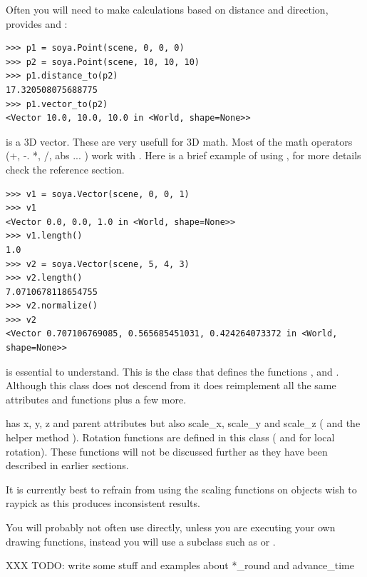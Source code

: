 Often you will need to make calculations based on distance and 
direction,  provides  and 
:
\begin{verbatim}
>>> p1 = soya.Point(scene, 0, 0, 0)
>>> p2 = soya.Point(scene, 10, 10, 10)
>>> p1.distance_to(p2)
17.320508075688775
>>> p1.vector_to(p2)
<Vector 10.0, 10.0, 10.0 in <World, shape=None>>
\end{verbatim}

 is a 3D vector. These are very usefull for 3D math.
Most of the math operators (+, -. *, /, abs ... ) work with 
. Here is a brief example of using ,
for more details check the reference section.

\begin{verbatim}
>>> v1 = soya.Vector(scene, 0, 0, 1)
>>> v1
<Vector 0.0, 0.0, 1.0 in <World, shape=None>>
>>> v1.length()
1.0
>>> v2 = soya.Vector(scene, 5, 4, 3)
>>> v2.length()
7.0710678118654755
>>> v2.normalize()
>>> v2
<Vector 0.707106769085, 0.565685451031, 0.424264073372 in <World, shape=None>>

\end{verbatim}

 is essential to understand. This is the class that 
defines the functions ,  and 
. Although this class does not descend from 
 it does reimplement all the same attributes and functions plus 
a few more. 

 has x, y, z and parent attributes but also scale_x, scale_y 
and scale_z ( and the helper method ). Rotation functions 
are defined in this class ( and  for local 
rotation). These functions will not be discussed further as they have been described
in earlier sections.

\begin{notice}
It is currently best to refrain from using the scaling functions on objects 
wish to raypick as this produces inconsistent results.
\end{notice}

You will probably not often use  directly, unless you
are executing your own drawing functions, instead you will use a subclass such 
as  or . 

XXX TODO: write some stuff and examples  about *_round and advance_time

